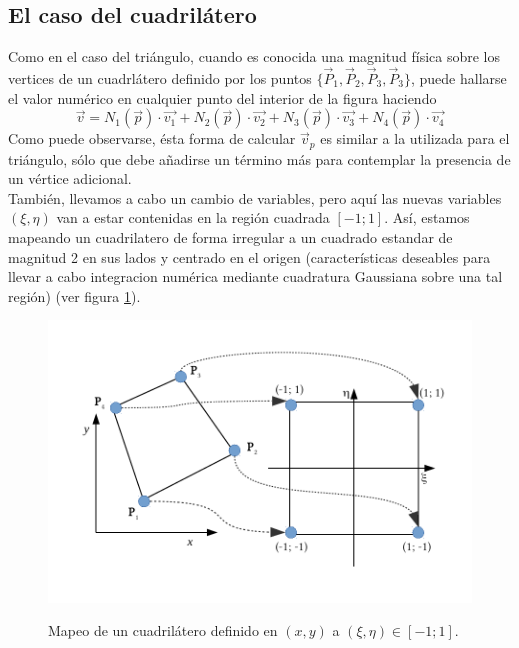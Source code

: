 \subsection{El caso del cuadrilátero}
\label{sec:cuadrilatero}
Como en el caso del triángulo, cuando es conocida una magnitud física sobre los vertices de un cuadrlátero definido por los puntos $ \lbrace \vec{P}_{1}, \vec{P}_{2}, \vec{P}_{3}, \vec{P}_{3}  \rbrace $, puede hallarse el valor numérico en cualquier punto del interior de la figura haciendo
\begin{equation}
\label{eq:combinacionlinealcuaxy}  
  \vec{v} = 
  N_{1}(\vec{p}) \cdot \vec{v_1} + 
  N_{2}(\vec{p}) \cdot \vec{v_2} + 
  N_{3}(\vec{p}) \cdot \vec{v_3} +  
  N_{4}(\vec{p}) \cdot \vec{v_4} 
\end{equation} 
Como puede observarse, ésta forma de calcular $ \vec{v}_{p} $ es similar a la utilizada para el triángulo, sólo que debe añadirse un término más para contemplar la presencia de un vértice adicional.
\\
También, llevamos a cabo un cambio de variables, pero aquí las nuevas variables $(\xi, \eta)$ van a estar contenidas en la región cuadrada $[-1;1]$. Así, estamos mapeando un cuadrilatero de forma irregular a un cuadrado estandar de magnitud 2 en sus lados y centrado en el origen (características deseables para llevar a cabo integracion numérica mediante cuadratura Gaussiana sobre una tal región)  (ver figura \ref{fig:cuad}). 

\begin{figure}
\centering
\includegraphics[scale=.8]{Cuadrilatero}
\caption{\label{fig:cuad} } Mapeo de un cuadrilátero definido en $(x,y)$ a $(\xi, \eta) \in [-1; 1]$.
\end{figure}

